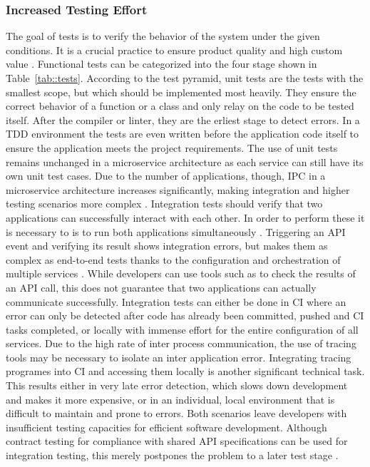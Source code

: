 \documentclass[12pt, a4paper]{article}
\begin{document}
        \subsubsection{Increased Testing Effort}\label{sss::testing_problem}
        The goal of tests is to verify the behavior of the system under the given conditions. It is a crucial practice to ensure product quality and high custom value \cite{azuredevops}. Functional tests can be categorized into the four stage shown in Table~\ref{tab::tests}. According to the test pyramid, unit tests are the tests with the smallest scope, but which should be implemented most heavily. They ensure the correct behavior of a function or a class and only relay on the code to be tested itself. After the compiler or linter, they are the erliest stage to detect errors. In a \ac{TDD} environment the tests are even written before the application code itself to ensure the application meets the project requirements. The use of unit tests remains unchanged in a microservice architecture as each service can still have its own unit test cases. Due to the number of applications, though, \ac{IPC} in a microservice architecture increases significantly, making integration and higher testing scenarios more complex \cite{microtest}. \newline
        Integration tests should verify that two applications can successfully interact with each other. In order to perform these it is necessary to is to run both applications simultaneously \cite{azuredevops}. Triggering an \ac{API} event and verifying its result shows integration errors, but makes them as complex as end-to-end tests thanks to the configuration and orchestration of multiple services \cite{microtest}. While developers can use tools such as  to check the results of an \ac{API} call, this does not guarantee that two applications can actually communicate successfully. Integration tests can either be done in \ac{CI} where an error can only be detected after code has already been committed, pushed and \ac{CI} tasks completed, or locally with immense effort for the entire configuration of all services. Due to the high rate of inter process communication, the use of tracing tools may be necessary to isolate an inter application error. Integrating tracing programes into \ac{CI} and accessing them locally is another significant technical task. This results either in very late error detection, which slows down development and makes it more expensive, or in an individual, local environment that is difficult to maintain and prone to errors. Both scenarios leave developers with insufficient testing capacities for efficient software development. Although contract testing for compliance with shared \ac{API} specifications can be used for integration testing, this merely postpones the problem to a later test stage \cite{microtest}.\newline
\end{document}
